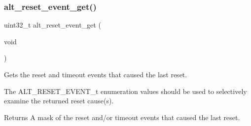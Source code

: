 \subsubsection{\texorpdfstring{alt\_reset\_event\_get()}{alt\_reset\_event\_get()}}
{\footnotesize\ttfamily uint32\+\_\+t alt\+\_\+reset\+\_\+event\+\_\+get (\begin{DoxyParamCaption}\item[{void}]{ }\end{DoxyParamCaption})}

Gets the reset and timeout events that caused the last reset.

The A\+L\+T\+\_\+\+R\+E\+S\+E\+T\+\_\+\+E\+V\+E\+N\+T\+\_\+t enumeration values should be used to selectively examine the returned reset cause(s).

\begin{DoxyReturn}{Returns}
A mask of the reset and/or timeout events that caused the last reset. 
\end{DoxyReturn}
